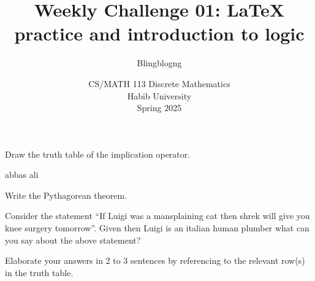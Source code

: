 \documentclass[a4paper]{exam}
\title{Weekly Challenge 01: \LaTeX\; practice and introduction to logic}
\author{Blingblogng} %
\date{CS/MATH 113 Discrete Mathematics\\Habib University\\Spring 2025}
\begin{document}
\maketitle

\begin{questions}
  
 Draw the truth table of the implication operator.
\begin{solution}
    abbas ali
\end{solution}

 Write the Pythagorean theorem.
\begin{solution}
\end{solution}

 Consider the statement ``If Luigi was a mansplaining cat then shrek will give you knee surgery tomorrow''. Given then Luigi is an italian human plumber what can you say about the above statement?

Elaborate your answers in 2 to 3 sentences by referencing to the relevant row(s) in the truth table.
\begin{solution}
\end{solution}


      
\end{questions}
\end{document}
